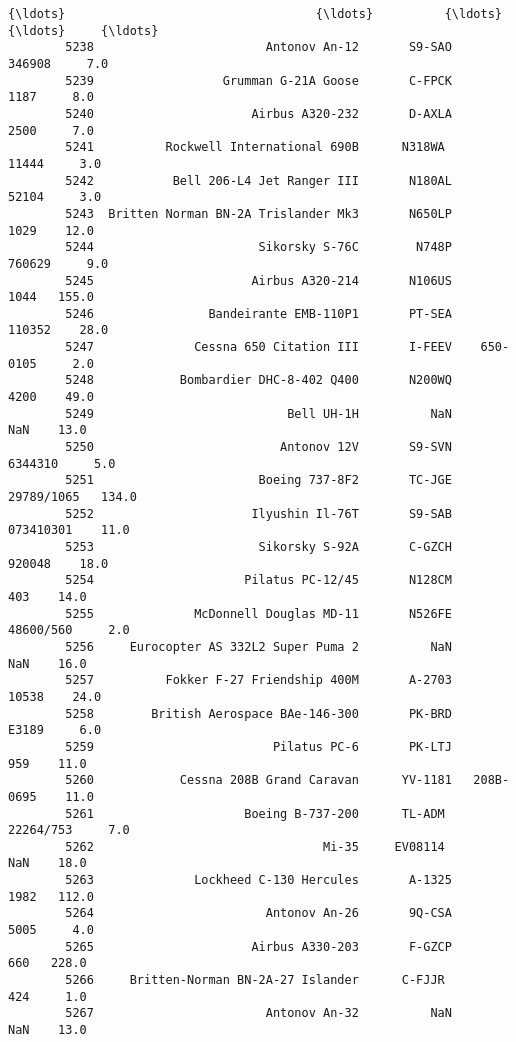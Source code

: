 \documentclass[11pt]{article}
\begin{document}
\begin{Verbatim}[commandchars=\\\{\}]
        {\ldots}                                   {\ldots}          {\ldots}         {\ldots}     {\ldots}   
        5238                        Antonov An-12       S9-SAO      346908     7.0   
        5239                  Grumman G-21A Goose       C-FPCK        1187     8.0   
        5240                      Airbus A320-232       D-AXLA        2500     7.0   
        5241          Rockwell International 690B      N318WA        11444     3.0   
        5242           Bell 206-L4 Jet Ranger III       N180AL       52104     3.0   
        5243  Britten Norman BN-2A Trislander Mk3       N650LP        1029    12.0   
        5244                       Sikorsky S-76C        N748P      760629     9.0   
        5245                      Airbus A320-214       N106US        1044   155.0   
        5246                Bandeirante EMB-110P1       PT-SEA      110352    28.0   
        5247              Cessna 650 Citation III       I-FEEV    650-0105     2.0   
        5248            Bombardier DHC-8-402 Q400       N200WQ        4200    49.0   
        5249                           Bell UH-1H          NaN         NaN    13.0   
        5250                          Antonov 12V       S9-SVN     6344310     5.0   
        5251                       Boeing 737-8F2       TC-JGE  29789/1065   134.0   
        5252                      Ilyushin Il-76T       S9-SAB   073410301    11.0   
        5253                       Sikorsky S-92A       C-GZCH      920048    18.0   
        5254                     Pilatus PC-12/45       N128CM         403    14.0   
        5255              McDonnell Douglas MD-11       N526FE   48600/560     2.0   
        5256     Eurocopter AS 332L2 Super Puma 2          NaN         NaN    16.0   
        5257          Fokker F-27 Friendship 400M       A-2703       10538    24.0   
        5258        British Aerospace BAe-146-300       PK-BRD       E3189     6.0   
        5259                         Pilatus PC-6       PK-LTJ         959    11.0   
        5260            Cessna 208B Grand Caravan      YV-1181   208B-0695    11.0   
        5261                     Boeing B-737-200      TL-ADM    22264/753     7.0   
        5262                                Mi-35     EV08114          NaN    18.0   
        5263              Lockheed C-130 Hercules       A-1325        1982   112.0   
        5264                        Antonov An-26       9Q-CSA        5005     4.0   
        5265                      Airbus A330-203       F-GZCP         660   228.0   
        5266     Britten-Norman BN-2A-27 Islander      C-FJJR          424     1.0   
        5267                        Antonov An-32          NaN         NaN    13.0   
        

\end{Verbatim}
\end{document}

